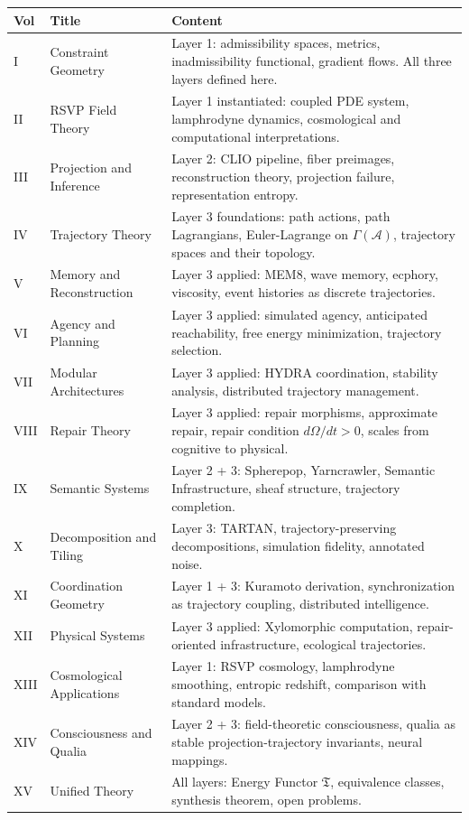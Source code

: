 \documentclass[11pt, a4paper]{article}
\begin{document}
\medskip
\begin{longtable}{p{1cm}p{4cm}p{7.5cm}}
\toprule
\textbf{Vol} & \textbf{Title} & \textbf{Content} \\
\midrule
I & Constraint Geometry &
  Layer 1: admissibility spaces, metrics, inadmissibility functional,
  gradient flows. All three layers defined here. \\
II & RSVP Field Theory &
  Layer 1 instantiated: coupled PDE system, lamphrodyne dynamics,
  cosmological and computational interpretations. \\
III & Projection and Inference &
  Layer 2: CLIO pipeline, fiber preimages, reconstruction theory,
  projection failure, representation entropy. \\
IV & Trajectory Theory &
  Layer 3 foundations: path actions, path Lagrangians, Euler-Lagrange
  on $\Gamma(\mathcal{A})$, trajectory spaces and their topology. \\
V & Memory and Reconstruction &
  Layer 3 applied: MEM\textbar{}8, wave memory, ecphory, viscosity,
  event histories as discrete trajectories. \\
VI & Agency and Planning &
  Layer 3 applied: simulated agency, anticipated reachability, free
  energy minimization, trajectory selection. \\
VII & Modular Architectures &
  Layer 3 applied: HYDRA coordination, stability analysis, distributed
  trajectory management. \\
VIII & Repair Theory &
  Layer 3 applied: repair morphisms, approximate repair, repair condition
  $d\Omega/dt > 0$, scales from cognitive to physical. \\
IX & Semantic Systems &
  Layer 2 + 3: Spherepop, Yarncrawler, Semantic Infrastructure, sheaf
  structure, trajectory completion. \\
X & Decomposition and Tiling &
  Layer 3: TARTAN, trajectory-preserving decompositions, simulation
  fidelity, annotated noise. \\
XI & Coordination Geometry &
  Layer 1 + 3: Kuramoto derivation, synchronization as trajectory
  coupling, distributed intelligence. \\
XII & Physical Systems &
  Layer 3 applied: Xylomorphic computation, repair-oriented
  infrastructure, ecological trajectories. \\
XIII & Cosmological Applications &
  Layer 1: RSVP cosmology, lamphrodyne smoothing, entropic redshift,
  comparison with standard models. \\
XIV & Consciousness and Qualia &
  Layer 2 + 3: field-theoretic consciousness, qualia as stable
  projection-trajectory invariants, neural mappings. \\
XV & Unified Theory &
  All layers: Energy Functor $\mathfrak{T}$, equivalence classes,
  synthesis theorem, open problems. \\
\bottomrule
\end{longtable}
\end{document}
